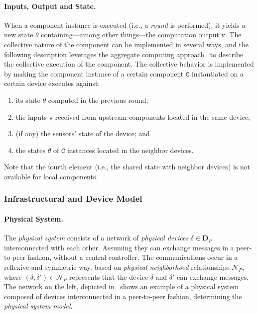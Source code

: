 \paragraph{Inputs, Output and State.}
When a component instance is executed (i.e., a \emph{round} is performed),
 it yields a new state $\theta$ containing---among other things---the computation output $\mathtt{v}$.
%
The collective nature of the component can be implemented in several ways,
 and the following description leverages the aggregate computing approach~\cite{DBLP:journals/computer/BealPV15} 
 to describe the collective execution of the component.
%
The collective behavior is implemented by making the component instance of a certain component $\mathtt{C}$ 
 instantiated on a certain device executes against:
\begin{enumerate}
  \item its state $\theta$ computed in the previous round;
  \item the inputs $\mathtt{v}$ received from upstream components located in the same device;
  \item (if any) the sensors' state of the device; and
  \item the states $\overline{\theta}$ of $\mathtt{C}$ instances located in the neighbor devices.
\end{enumerate}
Note that the fourth element (i.e., the shared state with neighbor devices) is not available for local components.

\subsubsection{Infrastructural and Device Model}

\paragraph{Physical System.}
The \emph{physical system} consists of a network of \emph{physical devices} $\delta \in \mathbf{D}_P$ interconnected with each other.
Assuming they can exchange messages in a peer-to-peer fashion,
 without a central controller.
%
The communications occur in a reflexive and symmetric way,
 based on \emph{physical neighborhood} relationships $\mathcal{N}_P$,
 where $(\delta, \delta') \in \mathcal{N}_P$ represents that the device $\delta$ and $\delta'$ can exchange messages.
%
The network on the left, depicted in~ 
 shows an example of a physical system composed of devices interconnected in a peer-to-peer fashion,
 determining the \emph{physical system model}.

